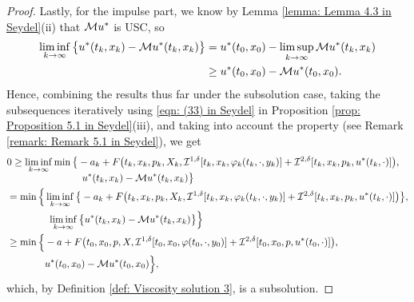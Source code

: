 \begin{proof}
    Lastly, for the impulse part, we know by Lemma \ref{lemma: Lemma 4.3 in Seydel}(ii) that $\mathcal{M} u^*$ is USC, so
    \begin{align*}
        \liminf_{k \rightarrow \infty} \big\{u^*(t_k,x_k) - \mathcal{M} u^*(t_k,x_k) \big\} &= u^*(t_0,x_0) - \limsup_{k \rightarrow \infty} \mathcal{M} u^*(t_k,x_k) \\
        & \geq u^*(t_0,x_0) - \mathcal{M} u^*(t_0,x_0).
    \end{align*}
    Hence, combining the results thus far under the subsolution case, taking the subsequences iteratively using \eqref{eqn: (33) in Seydel} in Proposition \ref{prop: Proposition 5.1 in Seydel}(iii), and taking into account the property  (see Remark \ref{remark: Remark 5.1 in Seydel}), we get
    \begin{align*}
    &0\geq \liminf_{k\to\infty} \min
        \begin{aligned}[t]
            & \big\{ -a_k + F\big(t_k,x_k,p_k,X_k,\mathcal{I}^{1,\delta}[t_k,x_k,\varphi_k(t_k,\cdot,y_k)] + \mathcal{I}^{2,\delta} [t_k,x_k,p_k,u^*(t_k,\cdot)]\big),\\
            & \quad  u^*(t_k,x_k)-\mathcal{M} u^*(t_k,x_k)\big\}
        \end{aligned}
        \\
        &= \min
        \begin{aligned}[t]
            & \Big\{ \liminf_{k\to\infty} \big\{-a_k + F\big(t_k,x_k,p_k,X_k,\mathcal{I}^{1,\delta}[t_k,x_k,\varphi_k(t_k,\cdot,y_k)]
             +\mathcal{I}^{2,\delta}[t_k,x_k,p_k,u^*(t_k,\cdot)]\big) \big\},\\
            & \quad \liminf_{k\to\infty}\big\{u^*(t_k,x_k)-\mathcal{M} u^*(t_k,x_k)\big\}\Big\}
        \end{aligned}
        \\
        & \ge \min
        \begin{aligned}[t]
            \Big\{ & -a + F\big(t_0,x_0,p,X, \mathcal{I}^{1,\delta}[t_0,x_0,\varphi(t_0,\cdot,y_0)] +\mathcal{I}^{2,\delta}[t_0,x_0,p,u^*(t_0,\cdot)]\big),\\
            & u^*(t_0,x_0)-\mathcal{M} u^*(t_0,x_0)\Big\},
        \end{aligned}   
    \end{align*}
    which, by Definition \ref{def: Viscosity solution 3}, is a subsolution. 


\end{proof}

